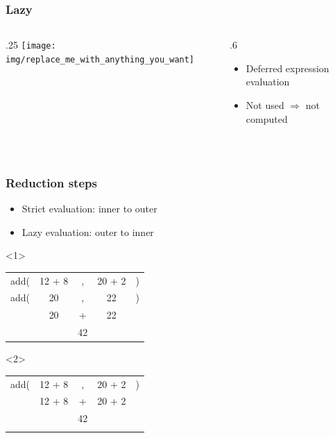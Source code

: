 \documentclass[17pt]{beamer}
\renewcommand{\(}[1]{\begin{columns}[#1]}
\renewcommand{\)}{\end{columns}}
\newcommand{\<}[1]{\begin{column}{#1}}
\renewcommand{\>}{\end{column}}
\begin{document}
\begin{frame}
  \frametitle{Lazy}
  \({c}
  \<{.25\textwidth}
  \texttt{[image: img/replace\_me\_with\_anything\_you\_want]}
  \>
  \<{.6\textwidth}
  \begin{itemize}
  \item Deferred expression evaluation
  \item Not used $\Rightarrow$ not computed
  \end{itemize}
  \>
  \)
  \pause
  ~\\
  \begin{center}
    \Large
  \end{center}
\end{frame}

\begin{frame}
  \frametitle{Reduction steps}
  \begin{itemize}
  \item<1-> Strict evaluation: inner to outer
  \item<2-> Lazy evaluation: outer to inner
  \end{itemize}
  \begin{onlyenv}<1>
    \begin{center}
      \begin{tabular}{ c c c c c }
        \\ add( & 12 + 8 & ,  & 20 + 2 & )
        \\ add( & 20     & ,  & 22     & )
        \\      & 20     & +  & 22     &
        \\      &        & 42 &        &
      \end{tabular}
    \end{center}
  \end{onlyenv}
  \begin{onlyenv}<2>
    \begin{center}
      \begin{tabular}{ c c c c c }
        \\ add( & 12 + 8 & ,  & 20 + 2 & )
        \\      & 12 + 8 & +  & 20 + 2 &
        \\      &        & 42 &        &
        \\      &        &    &        &
      \end{tabular}
    \end{center}
  \end{onlyenv}
\end{frame}
\end{document}

